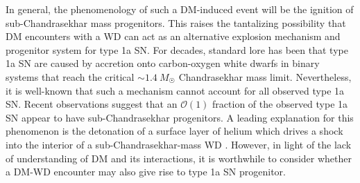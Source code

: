 \documentclass[twocolumn, preprintnumbers,amsmath,amssymb,prd, superscriptaddress]{revtex4}
\newcommand{\OO}{\mathcal{O}}
\begin{document}
In general, the phenomenology of such a DM-induced event will be the ignition of sub-Chandrasekhar mass progenitors.
This raises the tantalizing possibility that DM encounters with a WD can act as an alternative explosion mechanism and progenitor system for type 1a SN.
For decades, standard lore has been that type 1a SN are caused by accretion onto carbon-oxygen white dwarfs in binary systems that reach the critical $\sim 1.4 ~M_{\astrosun}$ Chandrasekhar mass limit.
Nevertheless, it is well-known that such a mechanism cannot account for all observed type 1a SN.
Recent observations \cite{Scalzo:2014sap, Scalzo:2014wxa} suggest that an $\OO(1)$ fraction of the observed type 1a SN appear to have sub-Chandrasekhar progenitors.
A leading explanation for this phenomenon is the detonation of a surface layer of helium which drives a shock into the interior of a sub-Chandrasekhar-mass WD \cite{Woosley1994,Fink:2007fv}.
However, in light of the lack of understanding of DM and its interactions, it is worthwhile to consider whether a DM-WD encounter may also give rise to type 1a SN progenitor.
\end{document}
